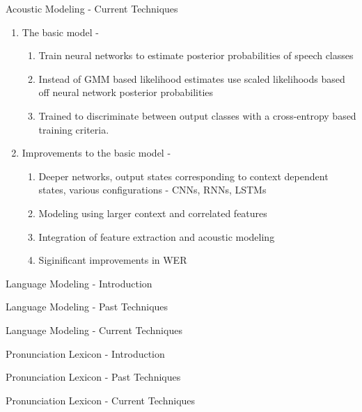 \begin{frame}{Acoustic Modeling - Current Techniques}
\begin{enumerate}
\item The \alert{basic} model -
\begin{enumerate}
\item Train neural networks to estimate posterior probabilities of speech classes
\item Instead of GMM based likelihood estimates use scaled likelihoods based
off neural network posterior probabilities
\item Trained to discriminate between output classes with a cross-entropy
based training criteria.
\end{enumerate}
\item \alert{Improvements to the basic model} -
\begin{enumerate}
\item Deeper networks, output states corresponding to context dependent states, 
various configurations - CNNs, RNNs, LSTMs
\item Modeling using larger context and correlated features
\item Integration of feature extraction and acoustic modeling
\item Siginificant improvements in WER 
\end{enumerate}
\end{enumerate}
\end{frame}

\begin{frame}{Language Modeling - Introduction}
\end{frame}

\begin{frame}{Language Modeling - Past Techniques}
\end{frame}

\begin{frame}{Language Modeling - Current Techniques}
\end{frame}

\begin{frame}{Pronunciation Lexicon - Introduction}
\end{frame}

\begin{frame}{Pronunciation Lexicon - Past Techniques}
\end{frame}

\begin{frame}{Pronunciation Lexicon - Current Techniques}
\end{frame}

